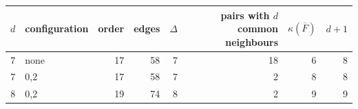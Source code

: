 \begin{tabular}{rlrrrrrr}
\toprule
$d$ & configuration & order & edges & $\Delta$ & pairs with $d$ common neighbours & $\kappa(\overline F)$ & $d+1$ \\
\midrule
7 & none & 17 & 58 & 7 & 18 & 6 & 8 \\
7 & 0,2 & 17 & 58 & 7 & 2 & 8 & 8 \\
8 & 0,2 & 19 & 74 & 8 & 2 & 9 & 9 \\
\bottomrule
\end{tabular}
